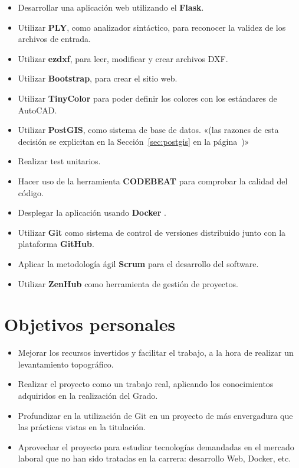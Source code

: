 \begin{itemize}
\item Desarrollar una aplicación web utilizando el  \textbf {Flask}.

\item Utilizar \textbf {PLY}, como analizador sintáctico, para reconocer la validez de los archivos de entrada.

\item Utilizar \textbf{ezdxf}, para leer, modificar y crear archivos DXF. 

\item Utilizar \textbf {Bootstrap}, para crear el sitio web.

\item Utilizar \textbf {TinyColor} para poder definir los colores con los estándares de AutoCAD.

\item Utilizar  \textbf {PostGIS}, como sistema de base de datos. «(las razones de esta decisión se explicitan en la Sección~\ref{sec:postgis} en la página~\pageref{sec:postgis})» 

\item Realizar test unitarios.

\item Hacer uso de la herramienta \textbf {CODEBEAT} para comprobar la calidad del código.

\item Desplegar la aplicación usando \textbf {Docker} .

\item Utilizar \textbf {Git} como sistema de control de versiones distribuido junto con la plataforma \textbf {GitHub}.

\item Aplicar la metodología ágil \textbf {Scrum} para el desarrollo del software.

\item Utilizar \textbf {ZenHub} como herramienta de gestión de proyectos.
\end{itemize}

\section{Objetivos personales}
\begin{itemize}
\item Mejorar los recursos invertidos y facilitar el trabajo, a la hora de realizar un levantamiento topográfico.

\item Realizar el proyecto como un trabajo real, aplicando los conocimientos adquiridos en la realización del Grado.
\item Profundizar en la utilización de Git en un proyecto de más envergadura que las prácticas vistas en la titulación.
\item Aprovechar el proyecto para estudiar tecnologías demandadas en el mercado laboral que no han sido tratadas en la carrera: desarrollo Web, Docker, etc.
\end{itemize}
